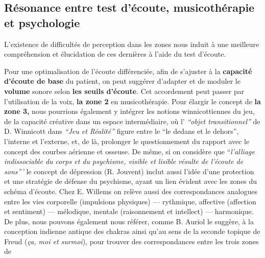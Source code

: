 \subsection{Résonance entre test d'écoute, musicothérapie et
	psychologie}
L'existence de difficultés de perception dans les zones nous
	induit à une meilleure compréhension et  élucidation de ces dernières à l'aide du
	test d'écoute. 
	
	Pour une optimalisation de l'écoute différenciée, afin de s'ajuster à la \textbf{capacité 
	d'écoute de base} 
du patient, on peut suggérer d'adapter et de moduler le \textbf{volume} sonore selon \textbf{les seuils 
d'écoute}. Cet accordement peut passer par 
l'utilisation 
de la voix, \textbf{la zone 2} en musicothérapie.
Pour élargir le concept de \textbf{la zone 3,} nous pourrions
également y intégrer les notions winnicottiennes du jeu, de la capacité
créative dans un espace
intermédiaire, où l' \textit{``objet
	transitionnel'' } de D. Winnicott dans \textit{``Jeu et Réalité''}
\autocite{winnicott}
figure entre le ``le
dedans et le
dehors'',
l'interne et l'externe, et, de là, prolonger le questionnement du
rapport avec le concept des
courbes aérienne et osseuse.
De même, si on considère que ``\emph{l'alliage indissociable du corps et du psychisme,
	visible et lisible résulte de l'écoute de
	sons'''}\autocite{tomatis_conf1972}
	 le concept de dépression (R. Jouvent) \autocite{doronparot}  inclut aussi l'idée d'une protection et 
	 une stratégie de
défense du psychisme, ayant un lien évident avec les zones du schéma d'écoute.
Chez E. Willems \autocite{willems} 
on relève aussi des correspondances 
	analogues entre les vies
corporelle (impulsions physiques)
--- rythmique, affective (affection et sentiment) --- mélodique, mentale
(raisonnement et intellect) --- harmonique.
     De plus, nous pouvons également nous référer, comme B. Auriol le suggère, à la conception indienne 
     antique des chakras
ainsi qu'au sens de la seconde
topique de Freud (\textit{ça, moi et surmoi}), pour trouver des correspondances
entre les trois zones de
